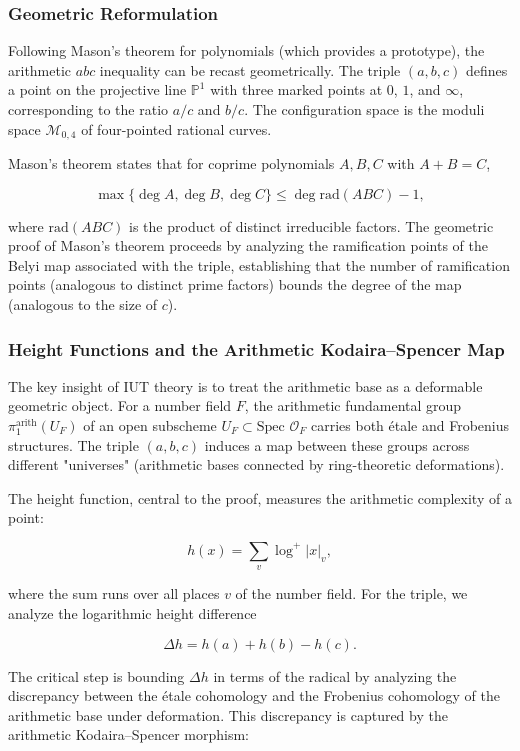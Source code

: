 \documentclass[12pt,a4paper]{article}
\begin{document}
\subsubsection{Geometric Reformulation}

Following Mason's theorem for polynomials (which provides a prototype), the arithmetic $abc$ inequality can be recast geometrically. The triple $(a, b, c)$ defines a point on the projective line $\mathbb{P}^1$ with three marked points at $0$, $1$, and $\infty$, corresponding to the ratio $a/c$ and $b/c$. The configuration space is the moduli space $\mathcal{M}_{0,4}$ of four-pointed rational curves.

Mason's theorem states that for coprime polynomials $A, B, C$ with $A + B = C$,

\[\max\{\deg A, \deg B, \deg C\} \leq \deg \text{rad}(ABC) - 1,\]

where $\text{rad}(ABC)$ is the product of distinct irreducible factors. The geometric proof of Mason's theorem proceeds by analyzing the ramification points of the Belyi map associated with the triple, establishing that the number of ramification points (analogous to distinct prime factors) bounds the degree of the map (analogous to the size of $c$).

\subsubsection{Height Functions and the Arithmetic Kodaira--Spencer Map}

The key insight of IUT theory is to treat the arithmetic base as a deformable geometric object. For a number field $F$, the arithmetic fundamental group $\pi_1^{\text{arith}}(U_F)$ of an open subscheme $U_F \subset \text{Spec } \mathcal{O}_F$ carries both étale and Frobenius structures. The triple $(a, b, c)$ induces a map between these groups across different "universes" (arithmetic bases connected by ring-theoretic deformations).

The height function, central to the proof, measures the arithmetic complexity of a point:

\[h(x) = \sum_{v} \log^+ |x|_v,\]

where the sum runs over all places $v$ of the number field. For the triple, we analyze the logarithmic height difference

\[\Delta h = h(a) + h(b) - h(c).\]

The critical step is bounding $\Delta h$ in terms of the radical by analyzing the discrepancy between the étale cohomology and the Frobenius cohomology of the arithmetic base under deformation. This discrepancy is captured by the arithmetic Kodaira--Spencer morphism:
\end{document}
